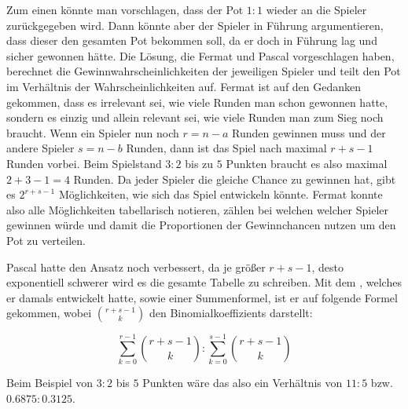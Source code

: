         Zum einen könnte man vorschlagen, dass der Pot $1:1$ wieder an die Spieler zurückgegeben wird. Dann könnte aber der Spieler in Führung argumentieren, dass dieser den gesamten Pot bekommen soll, da er doch in Führung lag und sicher gewonnen hätte. Die Lösung, die Fermat und Pascal vorgeschlagen haben, berechnet die Gewinnwahrscheinlichkeiten der jeweiligen Spieler und teilt den Pot im Verhältnis der Wahrscheinlichkeiten auf. Fermat ist auf den Gedanken gekommen, dass es irrelevant sei, wie viele Runden man schon gewonnen hatte, sondern es einzig und allein relevant sei, wie viele Runden man zum Sieg noch braucht. Wenn ein Spieler nun noch $r=n-a$ Runden gewinnen muss und der andere Spieler $s=n-b$ Runden, dann ist das Spiel nach maximal $r+s-1$ Runden vorbei. Beim Spielstand $3:2$ bis zu $5$ Punkten braucht es also maximal $2+3-1=4$ Runden. Da jeder Spieler die gleiche Chance zu gewinnen hat, gibt es $2^{r+s-1}$ Möglichkeiten, wie sich das Spiel entwickeln könnte. Fermat konnte also alle Möglichkeiten tabellarisch notieren, zählen bei welchen welcher Spieler gewinnen würde und damit die Proportionen der Gewinnchancen nutzen um den Pot zu verteilen.
        
        Pascal hatte den Ansatz noch verbessert, da je größer $r+s-1$, desto exponentiell schwerer wird es die gesamte Tabelle zu schreiben. Mit dem , welches er damals entwickelt hatte, sowie einer Summenformel, ist er auf folgende Formel gekommen, wobei $\binom{r+s-1}{k}$ den \Glspl{Binomialkoeffizient} darstellt:
        
        \[ \sum^{r-1}_{k=0} \binom{r+s-1}{k} : \sum^{s-1}_{k=0} \binom{r+s-1}{k} \]
        
        Beim Beispiel von $3:2$ bis $5$ Punkten wäre das also ein Verhältnis von $11:5$ bzw. $0.6875:0.3125$.